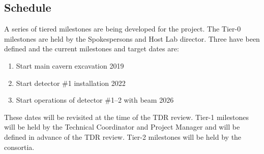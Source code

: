 \subsection{Schedule}
\label{sec:fdsp-coord-controls}

A series of tiered milestones are being developed for the 
project. The Tier-0 milestones are held by the Spokespersons and Host
Lab director. Three have been defined and the current milestones and
target dates are:
\begin{enumerate}
\item Start main cavern excavation \hspace{2.1in} 2019
\item Start detector \#1 installation \hspace{2.1in} 2022
\item Start operations of detector \#1--2 with beam \hspace{1in} 2026
\end{enumerate}
These dates will be revisited at the time of the TDR review.  Tier-1
milestones will be held by the Technical Coordinator and  Project
Manager and will be defined in advance of the TDR review. Tier-2
milestones will be held by the consortia.

